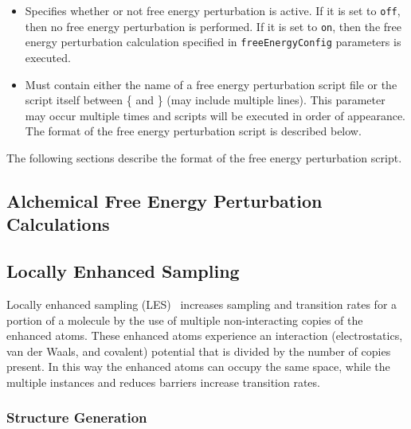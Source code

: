 \begin{itemize}

\item
{}
{Specifies whether or not free energy perturbation is active.  If it 
is set to {\tt off}, then no free energy perturbation is performed.  
If it is set to {\tt on}, then the free energy perturbation calculation specified in
{\tt freeEnergyConfig} parameters is executed.}

\item
{}
{Must contain either the name of a free energy perturbation script file or the script 
itself between \{ and \} (may include multiple lines).
This parameter may occur multiple times and scripts will be executed
in order of appearance.
The format of the free energy perturbation script is described below.
}

\end{itemize}

The following sections describe the format of the free energy perturbation script.




\subsection{Alchemical Free Energy Perturbation Calculations}
\label{section:alchemy}




\subsection{Locally Enhanced Sampling}
\label{section:les}

Locally enhanced sampling (LES)~\cite{ROIT91,SIMM98,SIMM00} increases
sampling and transition rates for a portion of a molecule by the use of
multiple non-interacting copies of the enhanced atoms.  These enhanced
atoms experience an interaction (electrostatics, van der Waals, and
covalent) potential that is divided by the number of copies present.
In this way the enhanced atoms can occupy the same space, while the
multiple instances and reduces barriers increase transition rates.

\subsubsection{Structure Generation}

